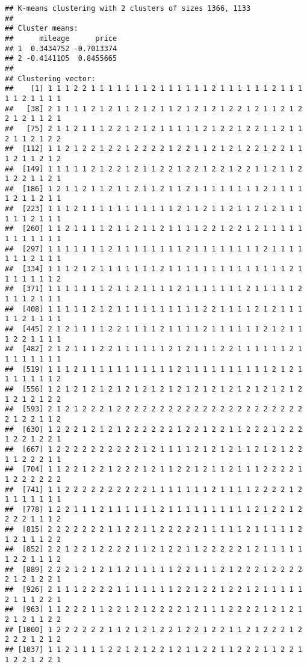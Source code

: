 \documentclass[
]{article}
\begin{document}
\begin{verbatim}
## K-means clustering with 2 clusters of sizes 1366, 1133
## 
## Cluster means:
##      mileage      price
## 1  0.3434752 -0.7013374
## 2 -0.4141105  0.8455665
## 
## Clustering vector:
##    [1] 1 1 1 2 2 1 1 1 1 1 1 1 2 1 1 1 1 1 1 2 1 1 1 1 1 1 2 1 1 1 1 1 2 1 1 1 1
##   [38] 2 1 1 1 1 2 1 2 1 1 2 1 2 1 1 2 1 2 1 2 1 2 2 1 2 1 1 2 1 2 2 1 2 1 1 2 1
##   [75] 2 1 1 2 1 1 1 2 2 1 2 1 2 1 1 1 1 1 2 1 2 2 1 2 2 1 1 2 1 1 2 1 1 2 1 2 2
##  [112] 1 1 2 1 2 2 1 2 2 1 2 2 2 2 1 2 2 1 1 2 1 2 1 2 2 1 2 2 1 1 1 2 1 1 2 1 2
##  [149] 1 1 1 1 1 2 1 2 2 1 2 1 1 2 2 1 2 2 1 2 2 1 2 2 1 1 2 1 1 2 1 2 2 1 1 2 1
##  [186] 1 2 1 1 2 1 1 2 1 1 2 1 1 2 1 1 2 1 1 1 1 1 1 1 1 2 1 1 1 1 1 2 1 1 2 1 1
##  [223] 1 1 1 2 1 1 1 1 1 1 1 1 1 1 1 2 1 1 2 1 1 2 1 1 2 1 2 1 1 1 1 1 1 2 1 1 1
##  [260] 1 1 2 1 1 1 1 2 1 1 2 1 1 2 1 1 1 1 2 2 1 2 2 1 2 1 1 1 1 1 1 1 1 1 1 1 1
##  [297] 1 1 1 1 1 1 1 2 1 1 1 1 1 1 1 1 2 1 1 1 1 1 1 1 1 2 1 1 1 1 1 1 1 2 1 1 1
##  [334] 1 1 1 2 1 2 1 1 1 1 1 1 1 2 1 1 1 1 1 1 1 1 1 1 1 1 1 1 2 1 1 1 1 1 1 1 2
##  [371] 1 1 1 1 1 1 1 2 1 1 2 1 1 1 1 2 1 1 1 1 1 1 1 2 1 1 1 1 1 2 1 1 1 2 1 1 1
##  [408] 1 1 1 1 1 2 1 2 1 1 1 1 1 1 1 1 1 1 2 2 1 1 1 1 2 1 2 1 1 1 1 1 2 1 1 1 1
##  [445] 2 1 2 1 1 1 1 2 2 1 1 1 1 2 1 1 1 1 2 1 1 1 1 1 1 2 1 2 1 1 1 2 2 1 1 1 1
##  [482] 2 1 2 1 1 1 2 2 1 1 1 1 1 1 2 1 2 1 1 1 2 2 1 1 1 1 1 1 2 1 1 1 1 1 1 1 1
##  [519] 1 1 1 2 1 1 1 1 1 1 1 1 1 1 1 2 1 1 1 1 1 1 1 1 1 1 2 1 2 1 1 1 1 1 1 1 2
##  [556] 1 2 1 2 1 2 1 2 1 2 1 2 1 2 1 2 1 2 1 2 1 2 1 2 1 2 1 2 1 2 1 2 1 2 1 2 2
##  [593] 2 1 2 1 2 2 2 1 2 2 2 2 2 2 2 2 2 2 2 2 2 2 2 2 2 2 2 2 2 2 2 1 2 2 1 1 2
##  [630] 1 2 2 2 1 2 1 2 1 2 2 2 2 2 2 1 2 2 1 2 2 1 1 2 2 2 1 2 2 2 1 2 2 1 2 2 1
##  [667] 1 2 2 2 2 2 2 2 2 2 2 1 2 1 1 1 1 2 1 2 1 2 1 1 2 1 2 1 2 2 1 1 2 2 2 1 1
##  [704] 1 1 2 2 1 2 2 1 2 2 2 1 2 1 1 2 2 1 2 1 1 2 1 1 1 2 2 2 2 1 1 2 2 2 2 2 2
##  [741] 1 1 2 2 2 2 2 2 2 2 2 2 1 1 1 1 1 1 1 2 1 1 1 1 2 2 2 2 1 2 1 1 1 1 1 1 1
##  [778] 1 2 2 1 1 1 2 1 1 1 1 1 1 2 1 1 1 1 1 1 1 1 1 1 2 1 2 2 1 2 2 2 2 1 1 1 2
##  [815] 2 2 2 2 2 2 2 1 1 2 2 1 1 2 2 2 2 2 1 1 1 1 1 2 1 1 1 1 1 2 1 2 1 1 1 2 2
##  [852] 2 2 1 2 2 1 2 2 2 2 1 1 2 1 2 2 1 1 2 2 2 2 2 1 2 1 1 1 1 1 1 2 2 1 1 1 2
##  [889] 2 2 2 1 2 1 2 1 1 2 1 1 1 1 1 2 2 1 1 1 2 1 2 2 2 1 2 2 2 2 2 1 2 1 2 2 1
##  [926] 2 1 1 1 2 2 2 2 1 1 1 1 1 1 1 2 2 1 2 2 1 2 2 1 2 1 1 1 1 1 2 1 1 1 2 2 1
##  [963] 1 1 2 2 2 1 1 2 2 1 2 1 2 2 2 2 1 2 1 1 1 2 2 2 2 1 2 1 2 1 2 1 2 1 1 2 2
## [1000] 1 2 2 2 2 2 2 1 1 2 1 2 1 2 2 1 2 2 1 2 2 1 1 2 1 2 2 2 1 2 2 2 2 1 2 1 2
## [1037] 1 1 2 1 1 1 1 2 2 1 2 1 2 2 1 2 1 1 2 2 1 1 2 2 2 1 1 2 2 1 1 2 2 1 2 2 1

\end{verbatim}
\end{document}
